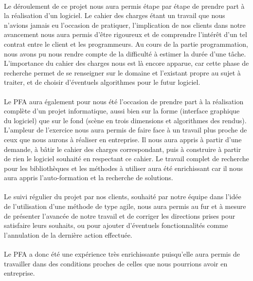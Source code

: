 \paragraph{}
Le déroulement de ce projet nous aura permis étape par étape de prendre part à la réalisation d'un logiciel. Le cahier des charges étant un travail que nous n'avions jamais eu l'occasion de pratiquer, l'implication de nos clients dans notre avancement nous aura permis d'être rigoureux et de comprendre l'intérêt d'un tel contrat entre le client et les programmeurs.
Au cours de la partie programmation, nous avons pu nous rendre compte de la difficulté à estimer la durée d'une tâche. L'importance du cahier des charges nous est là encore apparue, car cette phase de recherche permet de se renseigner sur le domaine et l'existant propre au sujet à traiter, et de choisir d'éventuels algorithmes pour le futur logiciel.

\paragraph{}
Le PFA aura également pour nous été l'occasion de prendre part à la réalisation complète d'un projet informatique, aussi bien sur la forme (interface graphique du logiciel) que sur le fond (scène en trois dimensions et algorithmes des rendus). L'ampleur de l'exercice nous aura permis de faire face à un travail plus proche de ceux que nous aurons à réaliser en entreprise. Il nous aura appris à partir d'une demande, à bâtir le cahier des charges correspondant, puis à construire à partir de rien le logiciel souhaité en respectant ce cahier. Le travail complet de recherche pour les bibliothèques et les méthodes à utiliser aura été enrichissant car il nous aura appris l'auto-formation et la recherche de solutions.

\paragraph{}
Le suivi régulier du projet par nos clients, souhaité par notre équipe dans l'idée de l'utilisation d'une méthode de type agile, nous aura permis au fur et à mesure de présenter l'avancée de notre travail et de corriger les directions prises pour satisfaire leurs souhaits, ou pour ajouter d'éventuels fonctionnalités comme l'annulation de la dernière action effectuée.

\paragraph{}
Le PFA a donc été une expérience très enrichissante puisqu'elle aura permis de travailler dans des conditions proches de celles que nous pourrions avoir en entreprise.
